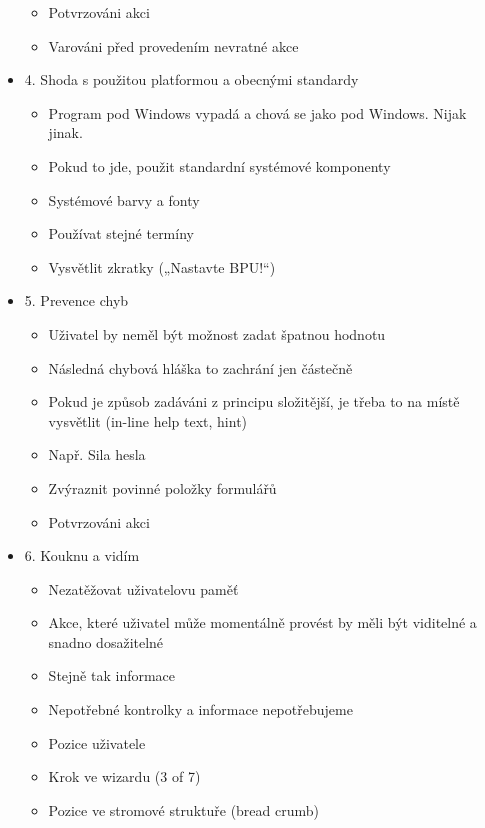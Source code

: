 \begin{itemize}
\begin{itemize}
            \item Potvrzováni akci
            \item Varováni před provedením nevratné akce
        \end{itemize}
    \item 4. Shoda s použitou platformou a obecnými standardy
        \begin{itemize}
            \item Program pod Windows vypadá a chová se jako pod Windows. Nijak jinak.
            \item Pokud to jde, použit standardní systémové komponenty
            \item Systémové barvy a fonty
            \item Používat stejné termíny
            \item Vysvětlit zkratky („Nastavte BPU!“)
        \end{itemize}
    \item 5. Prevence chyb
        \begin{itemize}
            \item Uživatel by neměl být možnost zadat špatnou hodnotu
            \item Následná chybová hláška to zachrání jen částečně
            \item Pokud je způsob zadáváni z principu složitější, je třeba to na místě vysvětlit (in-line help text, hint)
            \item Např. Sila hesla
            \item Zvýraznit povinné položky formulářů
            \item Potvrzováni akci
        \end{itemize}
    \item 6. Kouknu a vidím
        \begin{itemize}
            \item Nezatěžovat uživatelovu paměť
            \item Akce, které uživatel může momentálně provést by měli být viditelné a snadno dosažitelné
            \item Stejně tak informace
            \item Nepotřebné kontrolky a informace nepotřebujeme
            \item Pozice uživatele
            \item Krok ve wizardu (3 of 7)
            \item Pozice ve stromové struktuře (bread crumb)
        \end{itemize}

\end{itemize}
